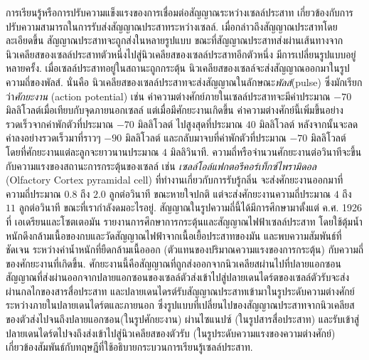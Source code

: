 {\begin{shaded}
การเรียนรู้หรือการปรับความแข็งแรงของการเชื่อมต่อสัญญาณระหว่างเซลล์ประสาท
เกี่ยวข้องกับการปรับความสามารถในการรับส่งสัญญาณประสาทระหว่างเซลล์.
%
เมื่อกล่าวถึงสัญญาณประสาทโดยละเอียดขึ้น 
สัญญาณประสาทจะถูกส่งในหลายรูปแบบ ขณะที่สัญญาณประสาทส่งผ่านเส้นทางจากนิวเคลียสของเซลล์ประสาทตัวหนึ่งไปสู่นิวเคลียสของเซลล์ประสาทอีกตัวหนึ่ง
มีการเปลี่ยนรูปแบบอยู่หลายครั้ง.
เมื่อเซลล์ประสาทอยู่ในสถานะถูกกระตุ้น นิวเคลียสของเซลล์จะส่งสัญญาณออกมาในรูปความถี่ของพัลส์.
นั่นคือ นิวเคลียสของเซลล์ประสาทจะส่งสัญญาณในลักษณะ\textit{พัลส์}(pulse) ซึ่งมักเรียกว่า\textit{ศักยะงาน} (action potential) 
เช่น ค่าความต่างศักย์ภายในเซลล์ประสาทจะมีค่าประมาณ $-70$ มิลลิโวลต์เมื่อเทียบกับจุดภายนอกเซลล์
แต่เมื่อมีศักยะงานเกิดขึ้น ค่าความต่างศักย์นี้เพิ่มขึ้นอย่างรวดเร็วจากค่าพักตัวที่ประมาณ $-70$ มิลลิโวลต์
ไปสูงสุดที่ประมาณ $40$ มิลลิโวลต์ หลังจากนั้นจะลดค่าลงอย่างรวดเร็วมาที่ราวๆ $-90$ มิลลิโวลต์ และกลับมาจบที่ค่าพักตัวที่ประมาณ $-70$ มิลลิโวลต์
โดยที่ศักยะงานแต่ละลูกจะยาวนานประมาณ $4$ มิลลิวินาที.
ความถี่หรือจำนวนศักยะงานต่อวินาทีจะขึ้นกับความแรงของสถานะการกระตุ้นของเซลล์ 
เช่น \textit{เซลล์โอล์แฟกตอรีคอร์เท็กซ์ไพรามิดอล} (Olfactory Cortex pyramidal cell) ที่ทำงานเกี่ยวกับการรับรู้กลิ่น จะส่งศักยะงานออกมาที่ความถี่ประมาณ $0.8$ ถึง $2.0$ ลูกต่อวินาที ขณะหายใจปกติ 
แต่จะส่งศักยะงานความถี่ประมาณ $4$ ถึง $11$ ลูกต่อวินาที ขณะที่เรากำลังดมอะไรอยู่\cite{NeuroBank}.
สัญญาณในรูปความถี่นี้ได้มีการศึกษามาตั้งแต่ ค.ศ. 1926 ที่ เอเดรียนและโซตเตอมัน\cite{AdrianZotterman1926a}
รายงานการศึกษาการกระตุ้นและสัญญาณไฟฟ้าเซลล์ประสาท
โดยใช้ตุ้มน้ำหนักดึงกล้ามเนื้อของกบและวัดสัญญาณไฟฟ้าจากเนื้อเยื้อประสาทของมัน
และพบความสัมพันธ์ที่ชัดเจน ระหว่างค่าน้ำหนักที่ยืดกล้ามเนื้อออก (ตัวแทนของปริมาณความแรงของการกระตุ้น)
กับความถี่ของศักยะงานที่เกิดขึ้น.
ศักยะงานนี้คือสัญญาณที่ถูกส่งออกจากนิวเคลียสผ่านไปที่ปลายแอกซอน
สัญญาณที่ส่งผ่านออกจากปลายแอกซอนของเซลล์ตัวส่งเข้าไปสู่ปลายเดนไดร์ตของเซลล์ตัวรับจะส่งผ่านกลไกของสารสื่อประสาท
และปลายเดนไดรต์รับสัญญาณประสาทเข้ามาในรูประดับความต่างศักย์ระหว่างภายในปลายเดนไดร์ตและภายนอก
ซึ่งรูปแบบที่เปลี่ยนไปของสัญญาณประสาทจากนิวเคลียสของตัวส่งไปจนถึงปลายแอกซอน(ในรูปศักยะงาน) ผ่านไซแนปซ์ (ในรูปสารสื่อประสาท) และรับเข้าสู่ปลายเดนไดร์ตไปจงถึงส่งเข้าไปสู่นิวเคลียสของตัวรับ (ในรูประดับความแรงของความต่างศักย์) เกี่ยวข้องสัมพันธ์กับทฤษฎีที่ใช้อธิบายกระบวนการเรียนรู้เซลล์ประสาท.



\end{shaded}}
